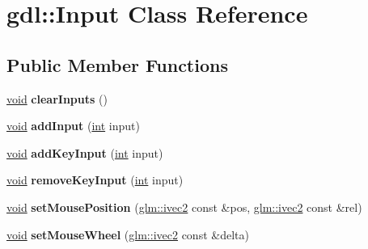 \hypertarget{classgdl_1_1_input}{}\section{gdl\+:\+:Input Class Reference}
\label{classgdl_1_1_input}
\subsection*{Public Member Functions}
\begin{DoxyCompactItemize}
\item 
\hypertarget{classgdl_1_1_input_a2cbd704d4c1069ac1fd7c4fb91d30b09}{}\hyperlink{_s_d_l__audio_8h_a52835ae37c4bb905b903cbaf5d04b05f}{void} {\bfseries clear\+Inputs} ()\label{classgdl_1_1_input_a2cbd704d4c1069ac1fd7c4fb91d30b09}

\item 
\hypertarget{classgdl_1_1_input_a7a175a63e780f1aa0fdebba68c0e8850}{}\hyperlink{_s_d_l__audio_8h_a52835ae37c4bb905b903cbaf5d04b05f}{void} {\bfseries add\+Input} (\hyperlink{_s_d_l__thread_8h_a6a64f9be4433e4de6e2f2f548cf3c08e}{int} input)\label{classgdl_1_1_input_a7a175a63e780f1aa0fdebba68c0e8850}

\item 
\hypertarget{classgdl_1_1_input_aa3380058a91f20b4889371ea07fd2bb4}{}\hyperlink{_s_d_l__audio_8h_a52835ae37c4bb905b903cbaf5d04b05f}{void} {\bfseries add\+Key\+Input} (\hyperlink{_s_d_l__thread_8h_a6a64f9be4433e4de6e2f2f548cf3c08e}{int} input)\label{classgdl_1_1_input_aa3380058a91f20b4889371ea07fd2bb4}

\item 
\hypertarget{classgdl_1_1_input_a531d2a805f5fdd33a0ce70ad74d0b3f8}{}\hyperlink{_s_d_l__audio_8h_a52835ae37c4bb905b903cbaf5d04b05f}{void} {\bfseries remove\+Key\+Input} (\hyperlink{_s_d_l__thread_8h_a6a64f9be4433e4de6e2f2f548cf3c08e}{int} input)\label{classgdl_1_1_input_a531d2a805f5fdd33a0ce70ad74d0b3f8}

\item 
\hypertarget{classgdl_1_1_input_aa6be10489840280271415ec1311ce5af}{}\hyperlink{_s_d_l__audio_8h_a52835ae37c4bb905b903cbaf5d04b05f}{void} {\bfseries set\+Mouse\+Position} (\hyperlink{group__core__types_ga606b9d298d8aaa55c449182c340b4622}{glm\+::ivec2} const \&pos, \hyperlink{group__core__types_ga606b9d298d8aaa55c449182c340b4622}{glm\+::ivec2} const \&rel)\label{classgdl_1_1_input_aa6be10489840280271415ec1311ce5af}

\item 
\hypertarget{classgdl_1_1_input_a4864b681a18a087443024160861587fb}{}\hyperlink{_s_d_l__audio_8h_a52835ae37c4bb905b903cbaf5d04b05f}{void} {\bfseries set\+Mouse\+Wheel} (\hyperlink{group__core__types_ga606b9d298d8aaa55c449182c340b4622}{glm\+::ivec2} const \&delta)\label{classgdl_1_1_input_a4864b681a18a087443024160861587fb}


\end{DoxyCompactItemize}
